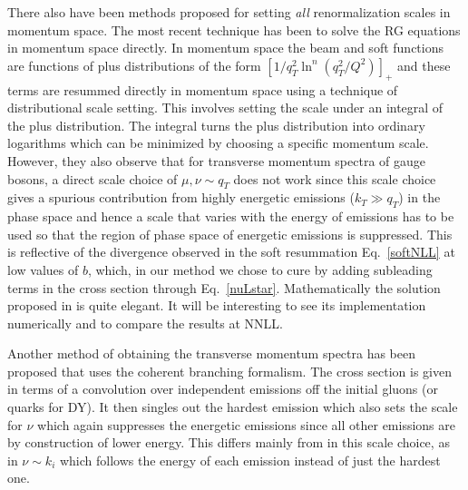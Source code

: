 \documentclass[a4,letterpaper,11pt]{article}
\newcommand{\eq}[1]{Eq.~\eqref{#1}}
\begin{document}
There also have been methods proposed for setting \emph{all} renormalization scales in momentum space. The  most recent \cite{Ebert:2016gcn} technique has been to solve the RG equations in momentum space directly. In momentum space the beam and soft functions are functions of plus distributions of the form $\left [ 1/q_T^2 \ln^n( q_T^2 /Q^2) \right]_+ $ and these terms are resummed directly in momentum space using  a technique of distributional scale setting. This involves setting the scale under an integral of the plus distribution. The integral turns the plus distribution into ordinary logarithms which can be minimized by choosing a specific momentum scale. However, they also observe that for transverse momentum spectra of gauge bosons, a direct scale choice of $\mu ,\nu \sim q_T$ does not work since this scale choice gives a spurious contribution from highly energetic emissions ($ k_T\gg q_T$) in the phase space and hence a scale that varies with the energy of emissions has to be used so that the region of phase space of energetic emissions is suppressed. This is reflective of the divergence observed in the soft resummation \eq{softNLL} at low values of $b$, which, in our method we chose to cure by adding subleading terms in the cross section through \eq{nuLstar}. Mathematically the solution proposed in \cite{Ebert:2016gcn} is quite elegant. It will be interesting to see its implementation numerically and to compare the results at NNLL.

Another method of obtaining the transverse momentum spectra has been proposed \cite{Monni:2016ktx,Bizon:2017rah} that uses the coherent branching formalism. The cross section is given in terms of a convolution over independent emissions off the initial gluons (or quarks for DY). It then singles out the hardest emission which also sets the scale for $\nu$ which again suppresses the energetic emissions since all other emissions are by construction of lower energy.  This differs mainly from \cite{Ebert:2016gcn} in this scale choice, as in  \cite{Ebert:2016gcn} $\nu \sim k_i$ which follows the energy of each emission instead of just the hardest one.
\end{document}
